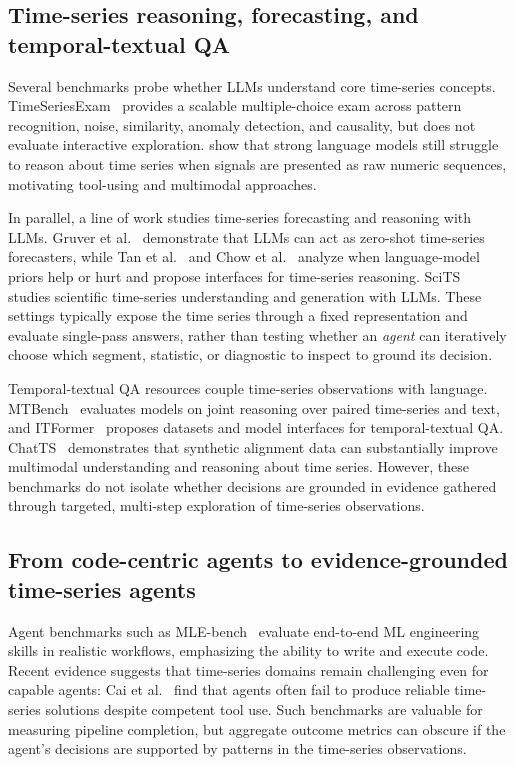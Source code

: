 \subsection{Time-series reasoning, forecasting, and temporal-textual QA}
Several benchmarks probe whether LLMs understand core time-series concepts.
TimeSeriesExam~\citep{cai2024timeseriesexam} provides a scalable multiple-choice exam across pattern recognition, noise, similarity, anomaly detection, and causality, but does not evaluate interactive exploration.
\citet{merrill2024language} show that strong language models still struggle to reason about time series when signals are presented as raw numeric sequences, motivating tool-using and multimodal approaches.

In parallel, a line of work studies time-series forecasting and reasoning with LLMs.
Gruver et al.~\citep{gruver2024large} demonstrate that LLMs can act as zero-shot time-series forecasters, while Tan et al.~\citep{tan2024are} and Chow et al.~\citep{chow2024towards} analyze when language-model priors help or hurt and propose interfaces for time-series reasoning.
SciTS~\citep{anonymous2025scits} studies scientific time-series understanding and generation with LLMs.
These settings typically expose the time series through a fixed representation and evaluate single-pass answers, rather than testing whether an \emph{agent} can iteratively choose which segment, statistic, or diagnostic to inspect to ground its decision.

Temporal-textual QA resources couple time-series observations with language.
MTBench~\citep{chen2025mtbench} evaluates models on joint reasoning over paired time-series and text, and ITFormer~\citep{wang2025itformer} proposes datasets and model interfaces for temporal-textual QA.
ChatTS~\citep{xie2024chatts} demonstrates that synthetic alignment data can substantially improve multimodal understanding and reasoning about time series.
However, these benchmarks do not isolate whether decisions are grounded in evidence gathered through targeted, multi-step exploration of time-series observations.

\subsection{From code-centric agents to evidence-grounded time-series agents}
Agent benchmarks such as MLE-bench~\citep{chan2024mle} evaluate end-to-end ML engineering skills in realistic workflows, emphasizing the ability to write and execute code.
Recent evidence suggests that time-series domains remain challenging even for capable agents: Cai et al.~\citep{cai2025llmAgents} find that agents often fail to produce reliable time-series solutions despite competent tool use.
Such benchmarks are valuable for measuring pipeline completion, but aggregate outcome metrics can obscure if the agent's decisions are supported by patterns in the time-series observations.

